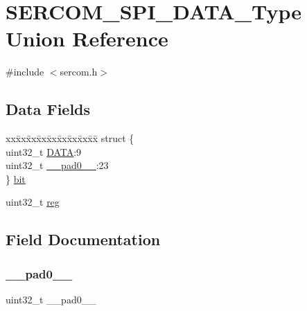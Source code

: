 \hypertarget{union_s_e_r_c_o_m___s_p_i___d_a_t_a___type}{}\section{S\+E\+R\+C\+O\+M\+\_\+\+S\+P\+I\+\_\+\+D\+A\+T\+A\+\_\+\+Type Union Reference}
\label{union_s_e_r_c_o_m___s_p_i___d_a_t_a___type}


{\ttfamily \#include $<$sercom.\+h$>$}

\subsection*{Data Fields}
\begin{DoxyCompactItemize}
\item 
\begin{tabbing}
xx\=xx\=xx\=xx\=xx\=xx\=xx\=xx\=xx\=\kill
struct \{\\
\>uint32\_t \mbox{\hyperlink{union_s_e_r_c_o_m___s_p_i___d_a_t_a___type_aad20077939fb7b9e145416f55028ea37}{DATA}}:9\\
\>uint32\_t \mbox{\hyperlink{union_s_e_r_c_o_m___s_p_i___d_a_t_a___type_a3e57c2ef1c3ffb36722f000cc1156824}{\_\_pad0\_\_}}:23\\
\} \mbox{\hyperlink{union_s_e_r_c_o_m___s_p_i___d_a_t_a___type_a1cccdcee603c8b7d757355a548a350b2}{bit}}\\

\end{tabbing}\item 
uint32\+\_\+t \mbox{\hyperlink{union_s_e_r_c_o_m___s_p_i___d_a_t_a___type_a6b91636401516a477989a336376d7b40}{reg}}
\end{DoxyCompactItemize}


\subsection{Field Documentation}
\mbox{\label{union_s_e_r_c_o_m___s_p_i___d_a_t_a___type_a3e57c2ef1c3ffb36722f000cc1156824}} 
\subsubsection{\texorpdfstring{\_\_pad0\_\_}{\_\_pad0\_\_}}
{\footnotesize\ttfamily uint32\+\_\+t \+\_\+\+\_\+pad0\+\_\+\+\_\+}

